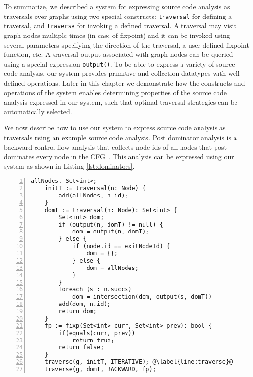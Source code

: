 To summarize, we described a system for expressing source code analysis as
traversals over graphs using two special constructs: \lstinline|traversal| for
defining a traversal, and \lstinline|traverse| for invoking a defined traversal. 
A traversal may visit graph nodes multiple times (in case of fixpoint) and it
can be invoked using several parameters specifying the direction of the
traversal, a user defined fixpoint function, etc.
A traversal output associated with graph nodes can be queried using a special
expression \lstinline|output()|. 
To be able to express a variety of source code analysis, our system provides
primitive and collection datatypes with well-defined operations.
Later in this chapter we demonstrate how the constructs and operations of the
system enables determining properties of the source code analysis expressed
in our system, such that optimal traversal strategies can be automatically
selected.

 We now describe how to use our system
to express source code analysis as traversals using an example source code analysis.
Post dominator analysis is a backward control flow analysis that collects node
ids of all nodes that post dominates every node in the CFG~\cite{compilers}.
This analysis can be expressed using our system as shown in Listing
\ref{lst:dominators}.

\begin{lstlisting}[basicstyle=\footnotesize\ttfamily, numbers=left, numbersep=-8pt, 
escapechar=@, caption={Post dominator analysis: an example source code analysis
expressed using our system.}, label={lst:dominators}] 
	allNodes: Set<int>;
	initT := traversal(n: Node) { 
		add(allNodes, n.id);
	}
	domT := traversal(n: Node): Set<int> { 
		Set<int> dom;
		if (output(n, domT) != null) {
			dom = output(n, domT);
		} else {
			if (node.id == exitNodeId) {
				dom = {};
			} else {
				dom = allNodes;
			}
		}
		foreach (s : n.succs) 
			dom = intersection(dom, output(s, domT)) 
		add(dom, n.id); 
		return dom; 
	} 
	fp := fixp(Set<int> curr, Set<int> prev): bool {
		if(equals(curr, prev))
			return true;
		return false;
	}
	traverse(g, initT, ITERATIVE); @\label{line:traverse}@
	traverse(g, domT, BACKWARD, fp); 				
\end{lstlisting}

